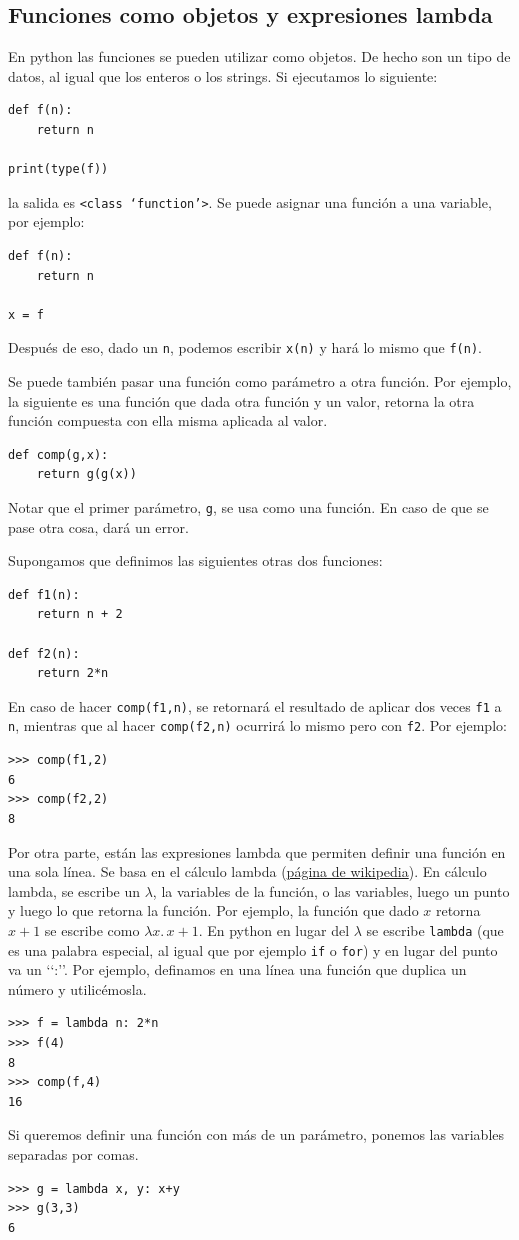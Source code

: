 \documentclass[a4paper, 12pt]{report}
\theoremstyle{definition}
\begin{document}
\subsection{Funciones como objetos y expresiones lambda}

En python las funciones se pueden utilizar como objetos. De hecho son un tipo de datos, al igual que los enteros o los strings. Si ejecutamos lo siguiente:
\begin{verbatim}
def f(n):
    return n

print(type(f))
\end{verbatim}
la salida es {\tt \textless class \lq function\rq \textgreater}. Se puede asignar una función a una variable, por ejemplo:
\begin{verbatim}
def f(n):
    return n

x = f
\end{verbatim}
Después de eso, dado un {\tt n}, podemos escribir {\tt x(n)} y hará lo mismo que {\tt f(n)}.

Se puede también pasar una función como parámetro a otra función. Por ejemplo, la siguiente es una función que dada otra función y un valor, retorna la otra función compuesta con ella misma aplicada al valor.
\begin{verbatim}
def comp(g,x):
    return g(g(x))
\end{verbatim}
Notar que el primer parámetro, {\tt g}, se usa como una función. En caso de que se pase otra cosa, dará un error.

Supongamos que definimos las siguientes otras dos funciones:
\begin{verbatim}
def f1(n):
    return n + 2

def f2(n):
    return 2*n
\end{verbatim}
En caso de hacer {\tt comp(f1,n)}, se retornará el resultado de aplicar dos veces {\tt f1} a {\tt n}, mientras que al hacer {\tt comp(f2,n)} ocurrirá lo mismo pero con {\tt f2}. Por ejemplo:
\begin{verbatim}
>>> comp(f1,2)
6
>>> comp(f2,2)
8
\end{verbatim}

Por otra parte, están las expresiones lambda que permiten definir una función en una sola línea. Se basa en el cálculo lambda (\href{https://es.wikipedia.org/wiki/C%C3%A1lculo_lambda}{página de wikipedia}). En cálculo lambda, se escribe un $\lambda$, la variables de la función, o las variables, luego un punto y luego lo que retorna la función. Por ejemplo, la función que dado $x$ retorna $x+1$ se escribe como $\lambda x.\,x+1$. En python en lugar del $\lambda$ se escribe {\tt lambda} (que es una palabra especial, al igual que por ejemplo {\tt if} o {\tt for}) y en lugar del punto va un \lq\lq:\rq\rq. Por ejemplo, definamos en una línea una función que duplica un número y utilicémosla.
\begin{verbatim}
>>> f = lambda n: 2*n
>>> f(4)
8
>>> comp(f,4)
16
\end{verbatim}
Si queremos definir una función con más de un parámetro, ponemos las variables separadas por comas.
\begin{verbatim}
>>> g = lambda x, y: x+y
>>> g(3,3)
6
\end{verbatim}
\end{document}

